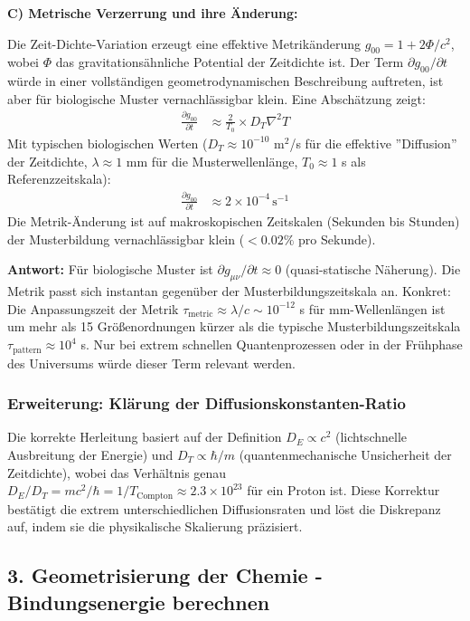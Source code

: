 	\textbf{C) Metrische Verzerrung und ihre Änderung:}
	
	Die Zeit-Dichte-Variation erzeugt eine effektive Metrikänderung $g_{00} = 1 + 2\Phi/c^2$, wobei $\Phi$ das gravitationsähnliche Potential der Zeitdichte ist. Der Term $\partial g_{00}/\partial t$ würde in einer vollständigen geometrodynamischen Beschreibung auftreten, ist aber für biologische Muster vernachlässigbar klein. Eine Abschätzung zeigt:
	\begin{align*}
		\frac{\partial g_{00}}{\partial t} &\approx \frac{2}{T_0} \times D_T \nabla^2 T
	\end{align*}
	Mit typischen biologischen Werten ($D_T \approx 10^{-10}$ m$^2$/s für die effektive ''Diffusion'' der Zeitdichte, $\lambda \approx 1$ mm für die Musterwellenlänge, $T_0 \approx 1$ s als Referenzzeitskala):
	\begin{align*}
		\frac{\partial g_{00}}{\partial t} &\approx 2 \times 10^{-4} \, \text{s}^{-1}
	\end{align*}
	Die Metrik-Änderung ist auf makroskopischen Zeitskalen (Sekunden bis Stunden) der Musterbildung vernachlässigbar klein ($< 0.02\%$ pro Sekunde).
	
	\textbf{Antwort:} Für biologische Muster ist $\partial g_{\mu\nu}/\partial t \approx 0$ (quasi-statische Näherung). Die Metrik passt sich instantan gegenüber der Musterbildungszeitskala an. Konkret: Die Anpassungszeit der Metrik $\tau_{\text{metric}} \approx \lambda/c \sim 10^{-12}$ s für mm-Wellenlängen ist um mehr als 15 Größenordnungen kürzer als die typische Musterbildungszeitskala $\tau_{\text{pattern}} \approx 10^4$ s. Nur bei extrem schnellen Quantenprozessen oder in der Frühphase des Universums würde dieser Term relevant werden.
	
	\subsubsection*{Erweiterung: Klärung der Diffusionskonstanten-Ratio}
	Die korrekte Herleitung basiert auf der Definition $D_E \propto c^2$ (lichtschnelle Ausbreitung der Energie) und $D_T \propto \hbar / m$ (quantenmechanische Unsicherheit der Zeitdichte), wobei das Verhältnis genau $D_E / D_T = m c^2 / \hbar = 1 / T_{\text{Compton}} \approx 2.3 \times 10^{23}$ für ein Proton ist. Diese Korrektur bestätigt die extrem unterschiedlichen Diffusionsraten und löst die Diskrepanz auf, indem sie die physikalische Skalierung präzisiert.
	
	\subsection*{3. Geometrisierung der Chemie - Bindungsenergie berechnen}
	
